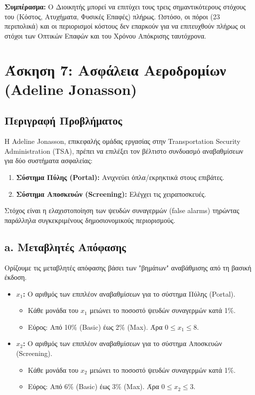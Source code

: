\documentclass[12pt, a4paper]{article}
\begin{document}
\textbf{Συμπέρασμα:}
Ο Διοικητής μπορεί να επιτύχει τους τρεις σημαντικότερους στόχους του (Κόστος, Ατυχήματα, Φυσικές Επαφές) πλήρως. Ωστόσο, οι πόροι (23 περιπολικά) και οι περιορισμοί κόστους δεν επαρκούν για να επιτευχθούν πλήρως οι στόχοι των Οπτικών Επαφών και του Χρόνου Απόκρισης ταυτόχρονα.



\section*{Άσκηση 7: Ασφάλεια Αεροδρομίων (Adeline Jonasson)}

\subsection*{Περιγραφή Προβλήματος}
Η Adeline Jonasson, επικεφαλής ομάδας εργασίας στην Transportation Security Administration (TSA), πρέπει να επιλέξει τον βέλτιστο συνδυασμό αναβαθμίσεων για δύο συστήματα ασφαλείας:
\begin{enumerate}
    \item \textbf{Σύστημα Πύλης (Portal):} Ανιχνεύει όπλα/εκρηκτικά στους επιβάτες.
    \item \textbf{Σύστημα Αποσκευών (Screening):} Ελέγχει τις χειραποσκευές.
\end{enumerate}
Στόχος είναι η ελαχιστοποίηση των ψευδών συναγερμών (false alarms) τηρώντας παράλληλα συγκεκριμένους δημοσιονομικούς περιορισμούς.

\subsection*{a. Μεταβλητές Απόφασης}
Ορίζουμε τις μεταβλητές απόφασης βάσει των "βημάτων" αναβάθμισης από τη βασική έκδοση.

\begin{itemize}
    \item \textbf{$x_1$:} Ο αριθμός των επιπλέον αναβαθμίσεων για το σύστημα Πύλης (Portal).
    \begin{itemize}
        \item Κάθε μονάδα του $x_1$ μειώνει το ποσοστό ψευδών συναγερμών κατά 1\%.
        \item Εύρος: Από 10\% (Basic) έως 2\% (Max). Άρα $0 \le x_1 \le 8$.
    \end{itemize}
    \item \textbf{$x_2$:} Ο αριθμός των επιπλέον αναβαθμίσεων για το σύστημα Αποσκευών (Screening).
    \begin{itemize}
        \item Κάθε μονάδα του $x_2$ μειώνει το ποσοστό ψευδών συναγερμών κατά 1\%.
        \item Εύρος: Από 6\% (Basic) έως 3\% (Max). Άρα $0 \le x_2 \le 3$.
    \end{itemize}
\end{itemize}
\end{document}
